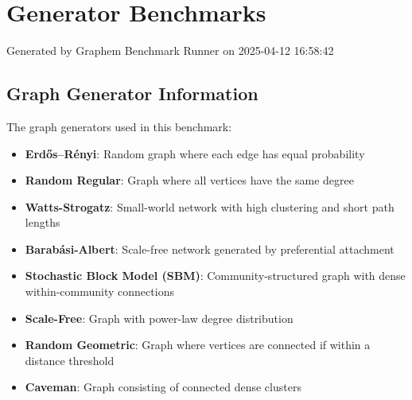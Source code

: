 \documentclass{article}
\begin{document}
\section*{Generator Benchmarks}
Generated by Graphem Benchmark Runner on 2025-04-12 16:58:42
\subsection*{Graph Generator Information}
The graph generators used in this benchmark:
\begin{itemize}
\item \textbf{Erdős–Rényi}: Random graph where each edge has equal probability
\item \textbf{Random Regular}: Graph where all vertices have the same degree
\item \textbf{Watts-Strogatz}: Small-world network with high clustering and short path lengths
\item \textbf{Barabási-Albert}: Scale-free network generated by preferential attachment
\item \textbf{Stochastic Block Model (SBM)}: Community-structured graph with dense within-community connections
\item \textbf{Scale-Free}: Graph with power-law degree distribution
\item \textbf{Random Geometric}: Graph where vertices are connected if within a distance threshold
\item \textbf{Caveman}: Graph consisting of connected dense clusters
\end{itemize}
\end{document}
